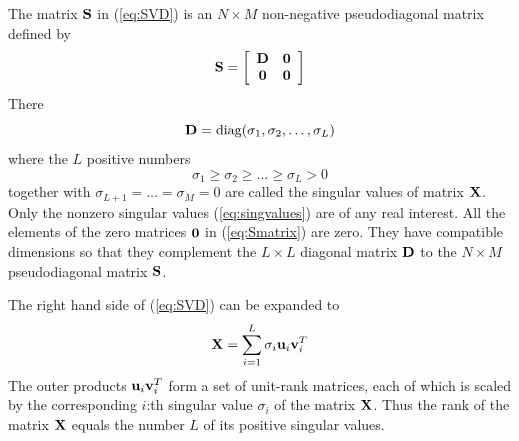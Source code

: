 \begin{enumerate}
\begin{solution}
    The matrix ${\bf S}$ in (\ref{eq:SVD}) is an $N \times M$ non-negative pseudodiagonal
    matrix defined by 
    \begin{equation}
      {\bf S} = \left[ \begin{array}{cc}
          {\bf D} & {\bf 0} \\
          {\bf 0} & {\bf 0} \end{array} \right]
      \label{eq:Smatrix}
    \end{equation}
    There 
    \begin{equation}
      {\bf D} = \mbox{diag}(\sigma_1,\sigma_2,\ldots,\sigma_L)
      \label{eq:Dmatrix}
    \end{equation}
    where the $L$ positive numbers 
    \begin{equation}
      \sigma_1 \geq \sigma_2 \geq \ldots \geq \sigma_L > 0
      \label{eq:singvalues}
    \end{equation}
    together with $\sigma_{L+1} = \ldots = \sigma_M = 0$ are called the singular values
    of matrix ${\bf X}$. Only the nonzero singular values (\ref{eq:singvalues}) are of
    any real interest. All the elements of the zero matrices ${\bf 0}$ in (\ref{eq:Smatrix})
    are zero. They have compatible dimensions so that they complement the $L \times L$
    diagonal matrix ${\bf D}$ to the $N \times M$ pseudodiagonal matrix ${\bf S}$.

    The right hand side of (\ref{eq:SVD}) can be expanded to
    \begin{equation}
      {\bf X} = \sum_{i=1}^L \sigma_i {\bf u}_i {\bf v}_i^T
      \label{eq:SVDexp}
    \end{equation}
    The outer products ${\bf u}_i {\bf v}_i^T$ form a set of unit-rank matrices, each
    of which is scaled by the corresponding $i$:th singular value $\sigma_i$ of the
    matrix ${\bf X}$. Thus the rank of the matrix ${\bf X}$ equals the number $L$ of
    its positive singular values.


\end{solution}
\end{enumerate}
